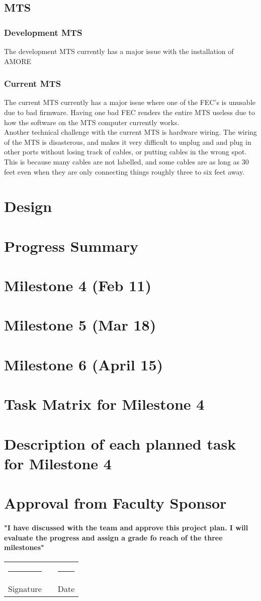\documentclass[12pt]{article}
\newcommand\tab[1][1cm]{\hspace*{#1}}
\newcommand{\doubleSignature}[2]{
	\begin{center}
		
	\end{center}
	\vspace{2cm}
	
	\noindent
	\begin{tabular}{lcl}
		\rule{7cm}{1pt} & \hspace{2cm} & \rule{3cm}{1pt} \\
		#1 & & #2
	\end{tabular}
	\vspace{1cm}
}
\begin{document}
\subsection{MTS}
\subsubsection{Development MTS}
\tab The development MTS currently has a major issue with the installation of AMORE
\subsubsection{Current MTS}
\tab The current MTS currently has a major issue where one of the FEC's is unusable due to bad firmware. Having one bad FEC renders the entire MTS useless due to how the software on the MTS computer currently works. \\
\tab Another technical challenge with the current MTS is hardware wiring. The wiring of the MTS is disasterous, and makes it very difficult to unplug and and plug in other ports without losing track of cables, or putting cables in the wrong spot. This is because many cables are not labelled, and some cables are as long as 30 feet even when they are only connecting things roughly three to six feet away. 
\section{Design}

\section{Progress Summary}

\section{Milestone 4 (Feb 11)}

\section{Milestone 5 (Mar 18)}

\section{Milestone 6 (April 15)}

\section{Task Matrix for Milestone 4}

\section{Description of each planned task for Milestone 4}

\section{Approval from Faculty Sponsor}
\paragraph{\tab "I have discussed with the team and approve this project plan. I will evaluate the progress and assign a grade fo reach of the three milestones"}
\doubleSignature{Signature}{Date}
\end{document}
